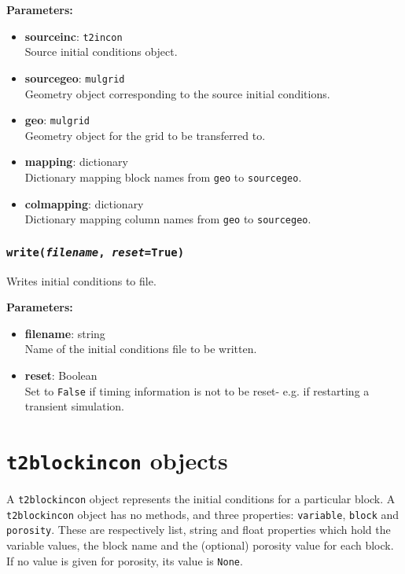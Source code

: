 \textbf{Parameters:}
\begin{itemize}
\item \textbf{sourceinc}: \texttt{t2incon}\\
  Source initial conditions object.
\item \textbf{sourcegeo}: \texttt{mulgrid}\\
  Geometry object corresponding to the source initial conditions.
\item \textbf{geo}: \texttt{mulgrid}\\
  Geometry object for the grid to be transferred to.
\item \textbf{mapping}: dictionary\\
  Dictionary mapping block names from \texttt{geo} to \texttt{sourcegeo}.
\item \textbf{colmapping}: dictionary\\
  Dictionary mapping column names from \texttt{geo} to \texttt{sourcegeo}.
\end{itemize}

\subsubsection{\texttt{write(\emph{filename}, \emph{reset}=True)}}

Writes initial conditions to file.

\textbf{Parameters:}
\begin{itemize}
\item \textbf{filename}: string\\
  Name of the initial conditions file to be written.
\item \textbf{reset}: Boolean\\
  Set to \texttt{False} if timing information is not to be reset- e.g. if restarting a transient simulation.
\end{itemize}

\section{\texttt{t2blockincon} objects}
\label{t2blockincons}

A \texttt{t2blockincon} object represents the initial conditions for a particular block.  A \texttt{t2blockincon} object has no methods, and three properties: \texttt{variable}, \texttt{block} and \texttt{porosity}.  These are respectively list, string and float properties which hold the variable values, the block name and the (optional) porosity value for each block.  If no value is given for porosity, its value is \texttt{None}.

